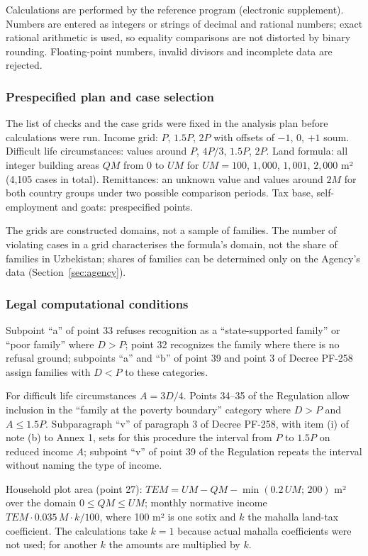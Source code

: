 \documentclass[14pt,a4paper]{extarticle}
\begin{document}
Calculations are performed by the reference program (electronic supplement). Numbers are entered as integers or strings of decimal and rational numbers; exact rational arithmetic is used, so equality comparisons are not distorted by binary rounding. Floating-point numbers, invalid divisors and incomplete data are rejected.

\subsubsection{Prespecified plan and case selection}
The list of checks and the case grids were fixed in the analysis plan before calculations were run. Income grid: $P$, $1.5P$, $2P$ with offsets of $-1$, $0$, $+1$ soum. Difficult life circumstances: values around $P$, $4P/3$, $1.5P$, $2P$. Land formula: all integer building areas $QM$ from $0$ to $UM$ for $UM=100$, $1{,}000$, $1{,}001$, $2{,}000$ m² (4,105 cases in total). Remittances: an unknown value and values around $2M$ for both country groups under two possible comparison periods. Tax base, self-employment and goats: prespecified points.

The grids are constructed domains, not a sample of families. The number of violating cases in a grid characterises the formula’s domain, not the share of families in Uzbekistan; shares of families can be determined only on the Agency’s data (Section~\ref{sec:agency}).

\subsubsection{Legal computational conditions}
Subpoint “a” of point 33 refuses recognition as a “state-supported family” or “poor family” where $D>P$; point 32 recognizes the family where there is no refusal ground; subpoints “a” and “b” of point 39 and point 3 of Decree PF-258 assign families with $D<P$ to these categories\cite{res35,pf258}.

For difficult life circumstances $A=3D/4$. Points 34–35 of the Regulation allow inclusion in the “family at the poverty boundary” category where $D>P$ and $A\le1.5P$. Subparagraph “v” of paragraph 3 of Decree PF-258, with item (i) of note (b) to Annex 1, sets for this procedure the interval from $P$ to $1.5P$ on reduced income $A$; subpoint “v” of point 39 of the Regulation repeats the interval without naming the type of income.

Household plot area (point 27): $TEM=UM-QM-\min(0.2\,UM;\,200)$ m² over the domain $0\le QM\le UM$; monthly normative income $TEM\cdot0.035\,M\cdot k/100$, where 100 m² is one sotix and $k$ the mahalla land-tax coefficient. The calculations take $k=1$ because actual mahalla coefficients were not used; for another $k$ the amounts are multiplied by $k$.
\end{document}
